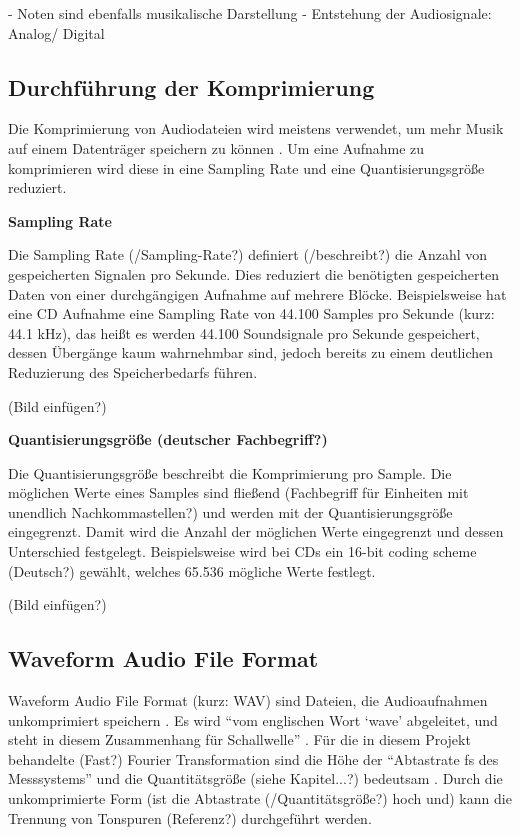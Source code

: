 %
 - Noten sind ebenfalls musikalische Darstellung
 - Entstehung der Audiosignale: Analog/ Digital

%
\subsection{Durchführung der Komprimierung}
%

Die Komprimierung von Audiodateien wird meistens verwendet, um mehr Musik auf einem Datenträger speichern zu können \parencite{what_is_audio_compression}. Um eine Aufnahme zu komprimieren wird diese in eine Sampling Rate und eine Quantisierungsgröße reduziert.

\par

%
\textbf{Sampling Rate}
%

Die Sampling Rate (/Sampling-Rate?) definiert (/beschreibt?) die Anzahl von gespeicherten Signalen pro Sekunde. Dies reduziert die benötigten gespeicherten Daten von einer durchgängigen Aufnahme auf mehrere Blöcke. Beispielsweise hat eine CD Aufnahme eine Sampling Rate von 44.100 Samples pro Sekunde (kurz: 44.1 kHz), das heißt es werden 44.100 Soundsignale pro Sekunde gespeichert, dessen Übergänge kaum wahrnehmbar sind, jedoch bereits zu einem deutlichen Reduzierung des Speicherbedarfs führen.

%
(Bild einfügen?)
%

%
\textbf{Quantisierungsgröße (deutscher Fachbegriff?)}
%

Die Quantisierungsgröße beschreibt die Komprimierung pro Sample. Die möglichen Werte eines Samples sind fließend (Fachbegriff für Einheiten mit unendlich Nachkommastellen?) und werden mit der Quantisierungsgröße eingegrenzt. Damit wird die Anzahl der möglichen Werte eingegrenzt und dessen Unterschied festgelegt. Beispielsweise wird bei CDs ein 16-bit coding scheme (Deutsch?) gewählt, welches 65.536 mögliche Werte festlegt.

%
(Bild einfügen?)
%

%
\subsection{Waveform Audio File Format}
%

Waveform Audio File Format (kurz: WAV) sind Dateien, die Audioaufnahmen unkomprimiert speichern \parencite{what_is_a_wav_file}. Es wird \enquote{vom englischen Wort \enquote{wave} abgeleitet, und steht in diesem Zusammenhang für Schallwelle} \parencite{wav}. Für die in diesem Projekt behandelte (Fast?) Fourier Transformation sind die Höhe der \enquote{Abtastrate fs des Messsystems} und die Quantitätsgröße (siehe Kapitel...?) bedeutsam \parencite{FFT_grundlagen}. Durch die unkomprimierte Form (ist die Abtastrate (/Quantitätsgröße?) hoch und) kann die Trennung von Tonspuren (Referenz?) durchgeführt werden.


